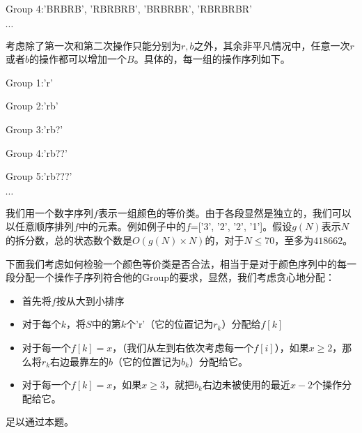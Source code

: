 \documentclass[12pt]{article}
\begin{document}
Group 4:'BRBRB', 'RBRBRB', 'BRBRBR', 'RBRBRBR'

$\cdots$

考虑除了第一次和第二次操作只能分别为$r,b$之外，其余非平凡情况中，任意一次$r$或者$b$的操作都可以增加一个$B$。具体的，每一组的操作序列如下。

Group 1:'r'

Group 2:'rb'

Group 3:'rb?'

Group 4:'rb??'

Group 5:'rb???'

$\cdots$

我们用一个数字序列$f$表示一组颜色的等价类。由于各段显然是独立的，我们可以以任意顺序排列$f$中的元素。例如例子中的$f$=['3', '2', '2', '1']。假设$g(N)$表示$N$的拆分数，总的状态数个数是$O(g(N)\times N)$的，对于$N\le 70$，至多为$418662$。

下面我们考虑如何检验一个颜色等价类是否合法，相当于是对于颜色序列中的每一段分配一个操作子序列符合他的Group的要求，显然，我们考虑贪心地分配：
\begin{itemize}
  \item 首先将$f$按从大到小排序
  \item 对于每个$k$，将$S$中的第$k$个'r'（它的位置记为$r_k$）分配给$f[k]$
  \item 对于每一个$f[k]=x$，（我们从左到右依次考虑每一个$f[i]$），如果$x\ge 2$，那么将$r_k$右边最靠左的$b$（它的位置记为$b_k$）分配给它。
  \item 对于每一个$f[k]=x$，如果$x\ge 3$，就把$b_k$右边未被使用的最近$x-2$个操作分配给它。
\end{itemize}

足以通过本题。

\newpage
\end{document}
